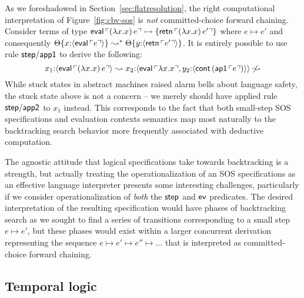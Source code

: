 As we
foreshadowed in Section~\ref{sec:flatresolution}, the right
computational interpretation of Figure~\ref{fig:cbv-sos} is {\it not}
committed-choice forward chaining. Consider terms of type ${\sf
  eval}\,{\ulcorner{(\lambda x.x)\,e}\urcorner} \rightarrowtail \{ {\sf
  retn}\,{\ulcorner{(\lambda x.x)\,e'}\urcorner} \}$ where $e \mapsto e'$ and
consequently ${\Theta}\{{x{:}\langle {{\sf eval}\,{\ulcorner{e}\urcorner}} \rangle}\}
\leadsto^* {\Theta}\{{y{:}\langle {{\sf retn}\,{\ulcorner{e'}\urcorner}} \rangle}\}$.
It is entirely possible to use rule ${\sf step/app1}$ to
derive the following:
\[
  x_1{:}\langle {{\sf eval}\,{\ulcorner{(\lambda x.x)\,e}\urcorner}} \rangle
   \leadsto
  x_2{:}\langle {{\sf eval}\,{\ulcorner{\lambda x.x}\urcorner},
  y_2{:}\langle {{\sf cont}\,({\sf ap1}\,{\ulcorner{e}\urcorner})} \rangle} \rangle
   \not\leadsto
\]
While stuck states in abstract machines raised alarm bells about
language safety, the stuck state above is not a concern -- we merely
should have applied rule ${\sf step/app2}$ to $x_1$ instead. This
corresponds to the fact that both small-step SOS specifications and
evaluation contexts semantics map most naturally to the backtracking
search behavior more frequently associated with deductive computation. 

The agnostic attitude that logical specifications take towards
backtracking is a strength, but actually treating the
operationalization of an SOS specifications as an effective language
interpreter presents some interesting challenges, particularly if we
consider operationalization of {\it both} the ${\sf step}$ and ${\sf
  ev}$ predicates. The desired interpretation of the resulting
specification would have phases of backtracking search as we sought to
find a series of transitions corresponding to a small step $e \mapsto
e'$, but these phases would exist within a larger concurrent
derivation representing the sequence $e \mapsto e' \mapsto e'' \mapsto
\ldots$ that is interpreted as committed-choice forward chaining.

\subsection{Temporal logic}

